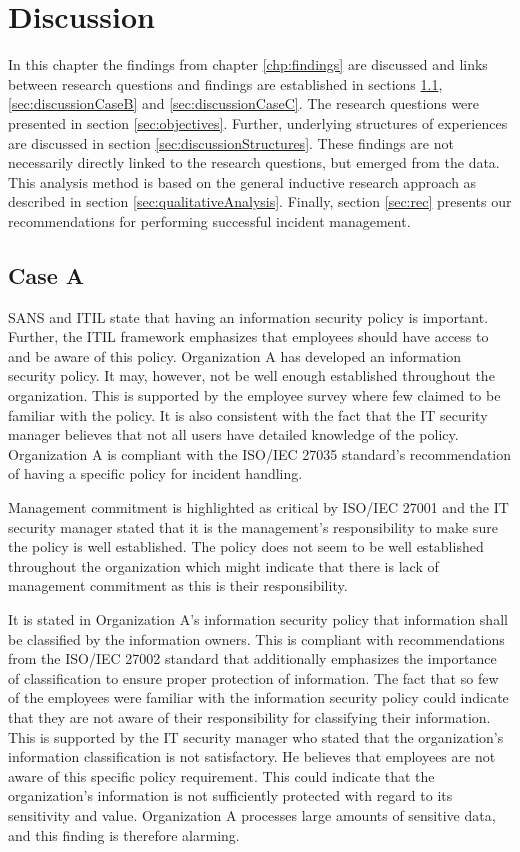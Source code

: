 \chapter{Discussion}
\label{chp:discussion}
In this chapter the findings from chapter \ref{chp:findings} are discussed and links between research questions and findings are established in sections \ref{sec:discussionCaseA}, \ref{sec:discussionCaseB} and \ref{sec:discussionCaseC}. The research questions were presented in section \ref{sec:objectives}. Further, underlying structures of experiences  are discussed in section \ref{sec:discussionStructures}. These findings are not necessarily  directly linked to the research questions, but emerged from the data. This analysis method is based on the general inductive research approach as described in section \ref{sec:qualitativeAnalysis}. Finally, section \ref{sec:rec} presents our recommendations for performing successful incident management.  

\section{Case A}
\label{sec:discussionCaseA}
SANS and \acs{ITIL} state that having an information security policy is important. Further, the \acs{ITIL} framework emphasizes that employees should have access to and be aware of this policy. Organization A has developed an information security policy. It may, however, not be well enough established throughout the organization. This is supported by the employee survey where few claimed to be familiar with the policy. It is also consistent with the fact that the IT security manager believes that not all users have detailed knowledge of the policy. Organization A is compliant with the ISO/IEC 27035 standard's recommendation of having a specific policy for incident handling. 

Management commitment is highlighted as critical by ISO/IEC 27001 and the IT security manager stated that it is the management's responsibility to make sure the policy is well established. The policy does not seem to be well established throughout the organization which might indicate that there is lack of management commitment as this is their responsibility.

It is stated in Organization A's information security policy that information shall be classified by the information owners. This is compliant with recommendations from the ISO/IEC 27002 standard that additionally emphasizes the importance of classification to ensure proper protection of information. The fact that so few of the employees were familiar with the information security policy could indicate that they are not aware of their responsibility for classifying their information. This is supported by the IT security manager who stated that the organization's information classification is not satisfactory. He believes that employees are not aware of this specific policy requirement. This could indicate that the organization's information is not sufficiently protected with regard to its sensitivity and value. Organization A processes large amounts of sensitive data, and this finding is therefore alarming.

